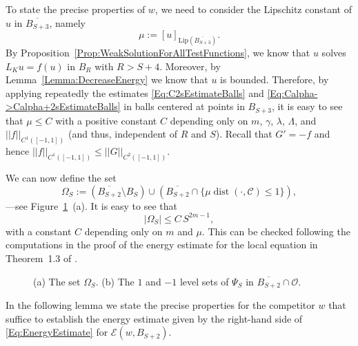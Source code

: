 \documentclass[12pt,reqno]{amsart}
\theoremstyle{definition}
\theoremstyle{remark}
\newcommand{\ccal}{\mathscr{C}}
\newcommand{\ecal}{\mathcal{E}}
\newcommand{\ocal}{\mathcal{O}}
\newcommand{\norm}[1]{\left | \left |{#1} \right | \right |}
\newcommand{\seminorm}[1]{\left [ {#1} \right ] }
\newcommand{\s}{\gamma}
\DeclareMathOperator{\dist}{dist}
\numberwithin{equation}{section}
\begin{document}
To state the precise properties of $w$, we need to consider the Lipschitz constant of $u$ in $\overline{B_{S+3}}$, namely
\begin{equation} 
\label{Eq:ChoiceMu} 
	\mu := \seminorm{u}_{\mathrm{Lip}(\overline{B_{S+3}})}. 
\end{equation} 
By Proposition~\ref{Prop:WeakSolutionForAllTestFunctions}, we know that $u$ solves $L_K u = f(u)$ in $B_R$ with $R> S+4$. Moreover, by Lemma~\ref{Lemma:DecreaseEnergy} we know that $u$ is bounded. Therefore, by applying repeatedly the estimates \eqref{Eq:C2sEstimateBalls} and \eqref{Eq:Calpha->Calpha+2sEstimateBalls} in balls centered at points in $B_{S+3}$, it is easy to see that $\mu\leq C$ with a positive constant $C$ depending only on $m$, $\s$, $\lambda$, $\Lambda$, and $\norm{f}_{C^1([-1,1])}$ (and thus, independent of $R$ and $S$). Recall that $G' = -f$ and hence $\norm{f}_{C^1([-1,1])} \leq \norm{G}_{C^2([-1,1])}$.

We can now define the set
\begin{equation}
\label{Eq:DefOmegaS}
\Omega_S := \left( \overline{B_{S+2}}\setminus B_S \right) \cup \left(  \overline{B_{S+2}} \cap \{\mu \dist(\cdot,\ccal) \leq 1\}\right),
\end{equation} 
---see Figure~\ref{Fig:PsiSandOmegaS}~(a). It is easy to see that 
\begin{equation}
\label{Eq:MeasureOmegaS}
|\Omega_S| \leq C\,S^{2m-1},
\end{equation}
with a constant $C$ depending only on $m$ and $\mu$. This can be checked following the computations in the proof of the energy estimate for the local equation in Theorem~1.3 of \cite{CabreTerraI}. 

\begin{figure}
	\centering
	\hspace{-0.26\textwidth} 
	\begin{subfigure}{0.21\textwidth}
		\centering
		
	\end{subfigure}
	\hspace{0.28\textwidth} 
	\begin{subfigure}{0.21\textwidth}
		\centering		
		
	\end{subfigure}
	\caption{(a) The set $\Omega_S$. (b) The $1$ and $-1$ level sets of $\Psi_S$ in $\overline{B_{S+2}}\cap \ocal$.}
	\label{Fig:PsiSandOmegaS}
\end{figure}

In the following lemma we state the precise properties for the competitor $w$ that suffice to establish the energy estimate given by the right-hand side of \eqref{Eq:EnergyEstimate} for $\ecal(w,B_{S+2})$.
\end{document}

